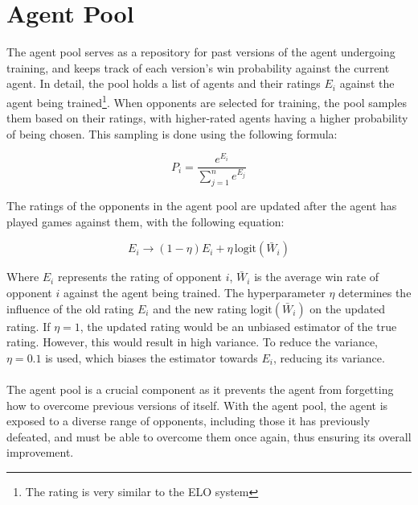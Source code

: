 \section{Agent Pool}
The agent pool serves as a repository for past versions of the agent undergoing training, and keeps track of each version's win probability against the current agent. In detail, the pool holds a list of agents and their ratings $E_i$ against the agent being trained\footnote{The rating is very similar to the ELO system}. When opponents are selected for training, the pool samples them based on their ratings, with higher-rated agents having a higher probability of being chosen. This sampling is done using the following formula:

\begin{equation}
    P_i = \frac{e^{E_i}}{\sum_{j=1}^n e^{E_j}}
    \label{eq:agent-pool-sampling}
\end{equation}

The ratings of the opponents in the agent pool are updated after the agent has played games against them, with the following equation:

\begin{equation}
    E_i \rightarrow (1-\eta) E_i + \eta \, \textrm{logit}(\bar W_i)
    \label{eq:agent-pool-rating-update}
\end{equation}

Where $E_i$ represents the rating of opponent $i$, $\bar W_i$ is the average win rate of opponent $i$ against the agent being trained. The hyperparameter $\eta$ determines the influence of the old rating $E_i$ and the new rating $\textrm{logit}(\bar W_i)$ on the updated rating. If $\eta = 1$, the updated rating would be an unbiased estimator of the true rating. However, this would result in high variance. To reduce the variance, $\eta = 0.1$ is used, which biases the estimator towards $E_i$, reducing its variance.\\\\
The agent pool is a crucial component as it prevents the agent from forgetting how to overcome previous versions of itself. With the agent pool, the agent is exposed to a diverse range of opponents, including those it has previously defeated, and must be able to overcome them once again, thus ensuring its overall improvement.


